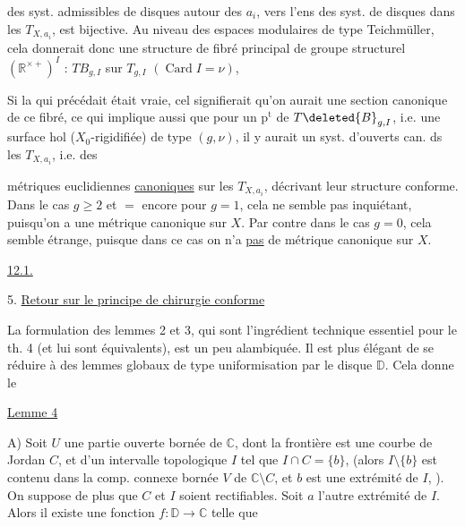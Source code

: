 des syst. admissibles de disques  autour
des $a_i$, vers l'ens des syst.
de disques   dans les $T_{X,a_i}$,
est bijective.  Au niveau des espaces
modulaires de type Teichmüller,
cela donnerait donc une  structure
de fibré principal  de groupe
structurel $(\mathbb{R}^{\times+})^I$ : $TB_{g,I}$
sur $T_{g,I}$ $(\operatorname{Card}I=\nu)$, 

 Si la  qui précédait
 était vraie, cel signifierait
qu'on aurait une section canonique
de ce fibré, ce qui implique
aussi que pour un $\mathrm{p}^{\mathrm{t}}$ de $T\deleted{B}_{g,I}$,
i.e. une surface hol  ($X_0$-rigidifiée)
de type $(g,\nu)$, il y aurait un syst.
d'ouverts can. ds les $T_{X,a_i}$, i.e. des

métriques euclidiennes \uline{canoniques} sur
les $T_{X,a_i}$, décrivant leur structure
conforme. Dans le cas $g\geq 2$ et $=$
encore pour $g=1$, cela ne semble pas
inquiétant, puisqu'on a une
métrique canonique sur $X$. Par
contre dans le cas $g=0$, cela semble
étrange, puisque dans ce cas on n'a
\uline{pas} de métrique canonique sur $X$.

\uline{12.1.}

5. \uline{Retour sur le principe de chirurgie conforme}

La formulation des lemmes  2 et 3, qui
sont l'ingrédient technique essentiel pour le
th. 4 (et lui sont équivalents), est un peu
alambiquée. Il est plus élégant de se
réduire à des lemmes globaux de type
uniformisation par le disque $\mathbb{D}$. Cela
donne le

\uline{Lemme 4}


A) Soit $U$ une partie ouverte bornée
de $\mathbb{C}$, dont la frontière est  une
courbe de Jordan 
$C$, et d'un  intervalle
topologique $I$ tel que
$I\cap C=\{b\}$,  (alors $I\setminus\{b\}$ est
contenu dans la comp. connexe
bornée $V$ de $\mathbb{C}\setminus C$, et $b$
est une extrémité de $I$, ).  On
suppose de plus que $C$ et $I$ soient rectifiables.
Soit $a$ l'autre extrémité de $I$. Alors il
existe une fonction  $f:\mathbb{D}\longrightarrow\mathbb{C}$
telle que

